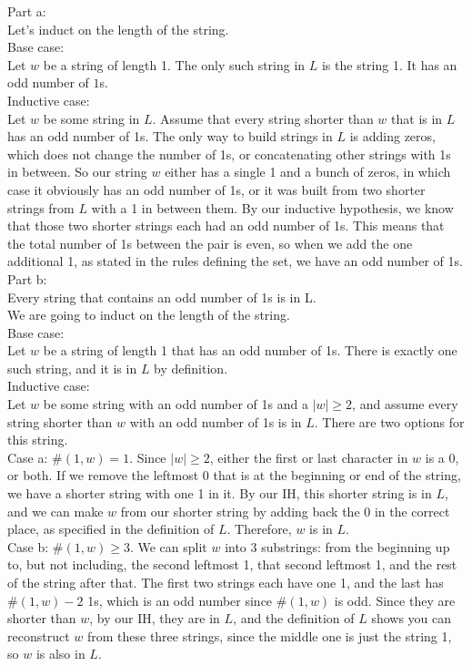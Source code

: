 \documentclass[11pt]{article}
\begin{document}
\begin{solution}
    Part a: \\
    Let's induct on the length of the string. \\
    Base case:\\
    Let $w$ be a string of length 1. The only such string in $L$ is the string 1. It has an odd number of $1$s.\\

    Inductive case:\\
    Let $w$ be some string in $L$. Assume that every string shorter than $w$ that is in $L$ has an odd number of 1s. The only way to build strings in $L$ is adding zeros, which does not change the number of 1s, or concatenating other strings with 1s in between. So our string $w$ either has a single 1 and a bunch of zeros, in which case it obviously has an odd number of 1s, or it was built from two shorter strings from $L$ with a 1 in between them. By our inductive hypothesis, we know that those two shorter strings each had an odd number of 1s. This means that the total number of 1s between the pair is even, so when we add the one additional 1, as stated in the rules defining the set, we have an odd number of 1s. \\ 

    Part b: \\
    Every string that contains an odd number of 1s is in L.\\
    We are going to induct on the length of the string. \\
    Base case: \\
    Let $w$ be a string of length 1 that has an odd number of 1s. There is exactly one such string, and it is in $L$ by definition.\\
    Inductive case: \\
    Let $w$ be some string with an odd number of 1s and a $|w| \geq 2$, and assume every string shorter than $w$ with an odd number of 1s is in $L$. There are two options for this string. \\
    Case a: $\#(1,w) = 1$. Since $|w| \geq 2$, either the first or last character in $w$ is a 0, or both. If we remove the leftmost 0 that is at the beginning or end of the string, we have a shorter string with one 1 in it. By our IH, this shorter string is in $L$, and we can make $w$ from our shorter string by adding back the 0 in the correct place, as specified in the definition of $L$. Therefore, $w$ is in $L$.\\
    Case b: $\#(1,w) \geq 3$. We can split $w$ into 3 substrings: from the beginning up to, but not including, the second leftmost 1, that second leftmost 1, and the rest of the string after that. The first two strings each have one 1, and the last has $\#(1,w)-2$ 1s, which is an odd number since $\#(1,w)$ is odd. Since they are shorter than $w$, by our IH, they are in $L$, and the definition of $L$ shows you can reconstruct $w$ from these three strings, since the middle one is just the string 1, so $w$ is also in $L$.
\end{solution}
\end{document}
